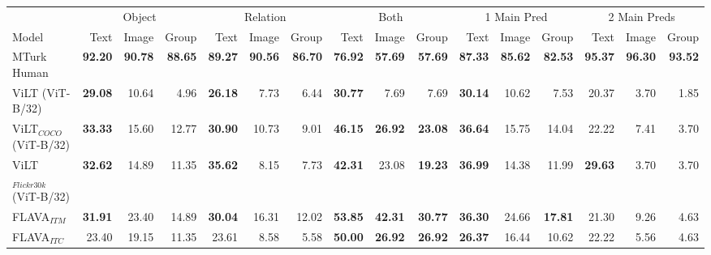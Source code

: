 \begin{table*}[!ht]
    \centering
    \begin{adjustbox}{max width=\textwidth}
  \begin{tabular}{l|rrr|rrr|rrr|rrr|rrr}
    \toprule
     &
      \multicolumn{3}{c|}{Object} &
      \multicolumn{3}{c|}{Relation} &
      \multicolumn{3}{c|}{Both} &
      \multicolumn{3}{c|}{1 Main Pred} &
      \multicolumn{3}{c}{2 Main Preds}\\
    Model & Text & Image & Group & Text & Image & Group & Text & Image & Group & Text & Image & Group & Text & Image & Group \\\midrule
 MTurk Human                  & \textbf{92.20} & \textbf{90.78} & \textbf{88.65} & \textbf{89.27} & \textbf{90.56} & \textbf{86.70} & \textbf{76.92} & \textbf{57.69} & \textbf{57.69} & \textbf{87.33} & \textbf{85.62} & \textbf{82.53} & \textbf{95.37} & \textbf{96.30} & \textbf{93.52} \\
 ViLT (ViT-B/32)                     & \textbf{29.08} & 10.64          & 4.96           & \textbf{26.18} & 7.73           & 6.44           & \textbf{30.77} & 7.69           & 7.69           & \textbf{30.14} & 10.62          & 7.53           & 20.37          & 3.70           & 1.85           \\
 ViLT$_{COCO}$ (ViT-B/32)            & \textbf{33.33} & 15.60          & 12.77          & \textbf{30.90} & 10.73          & 9.01           & \textbf{46.15} & \textbf{26.92} & \textbf{23.08} & \textbf{36.64} & 15.75          & 14.04          & 22.22          & 7.41           & 3.70           \\
 ViLT$_{Flickr30k}$ (ViT-B/32)       & \textbf{32.62} & 14.89          & 11.35          & \textbf{35.62} & 8.15           & 7.73           & \textbf{42.31} & 23.08          & \textbf{19.23} & \textbf{36.99} & 14.38          & 11.99          & \textbf{29.63} & 3.70           & 3.70           \\
 FLAVA$_{ITM}$                       & \textbf{31.91} & 23.40          & 14.89          & \textbf{30.04} & 16.31          & 12.02          & \textbf{53.85} & \textbf{42.31} & \textbf{30.77} & \textbf{36.30} & 24.66          & \textbf{17.81} & 21.30          & 9.26           & 4.63           \\
 FLAVA$_{ITC}$                       & 23.40          & 19.15          & 11.35          & 23.61          & 8.58           & 5.58           & \textbf{50.00} & \textbf{26.92} & \textbf{26.92} & \textbf{26.37} & 16.44          & 10.62          & 22.22          & 5.56           & 4.63           \\

\end{tabular}
\end{adjustbox}
\end{table*}
